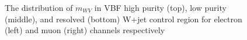 \begin{figure}[ht]
	\caption{The distribution of $m_{WV}$ in VBF high purity (top), low purity (middle), and resolved (bottom) W+jet control region for electron (left) and muon (right) channels respectively}
	\label{Fig:mWVVBFWR}
\end{figure}
\clearpage
